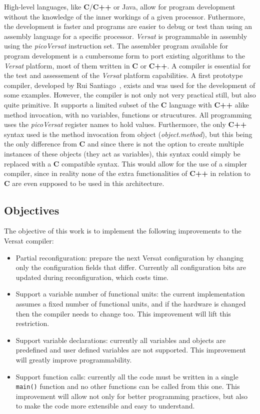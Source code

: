 \documentclass[journal]{IEEEtran}
\begin{document}
High-level languages, like {\bf C}/{\bf C++} or Java, allow for program
development without the knowledge of the inner workings of a given
processor. Futhermore, the development is faster and programs are easier to
debug or test than using an assembly language for a specific processor. {\it
  Versat} is programmable in assembly using the {\it picoVersat} instruction
set. The assembler program available for program development is a cumbersome
form to port existing algorithms to the {\it Versat} platform, most of them
written in {\bf C} or {\bf C++}.  A compiler is essential for the test and
assessement of the {\it Versat} platform capabilities.  A first prototype
compiler, developed by Rui Santiago~\cite{Santiago2016}, exists and was used for
the development of some examples.  However, the compiler is not only not very
practical still, but also quite primitive.  It supports a limited subset of the
{\bf C} language with {\bf C++} alike method invocation, with no variables,
functions or strucutures. All programming uses the {\it picoVersat} register
names to hold values.  Furthermore, the only {\bf C++} syntax used is the method
invocation from object ({\it object.method}), but this being the only difference from
{\bf C} and since there is not the option to create multiple instances of these
objects (they act as variables), this syntax could simply be replaced with a
{\bf C} compatible syntax. This would allow for the use of a simpler compiler,
since in reality none of the extra functionalities of {\bf C++} in relation
to {\bf C} are even supposed to be used in this architecture.

\subsection{Objectives}
\label{section:objectivo}

The objective of this work is to implement the following improvements to the
Versat compiler:
\begin{itemize}
\item Partial reconfiguration: prepare the next Versat configuration by changing
  only the configuration fields that differ. Currently all configuration bits
  are updated during reconfiguration, which costs time.
\item Support a variable number of functional units: the current implementation
  assumes a fixed number of functional units, and if the hardware is changed then
  the compiler needs to change too. This improvement will lift this restriction.
\item Support variable declarations: currently all variables and objects are
  predefined and user defined variables are not supported. This improvement
  will greatly improve programmability.
\item Support function calls: currently all the code must be written in a single
  {\tt main()} function and no other functions can be called from this one. This
  improvement will allow not only for better programming practices, but also to
  make the code more extensible and easy to understand.
\end{itemize}
\end{document}
